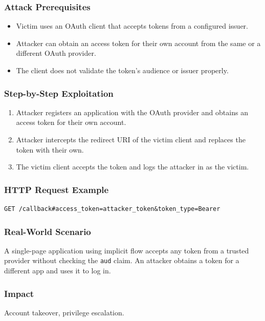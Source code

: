 \documentclass[12pt,a4paper]{article}
\begin{document}
\subsubsection{Attack Prerequisites}
\begin{itemize}
    \item Victim uses an OAuth client that accepts tokens from a configured issuer.
    \item Attacker can obtain an access token for their own account from the same or a different OAuth provider.
    \item The client does not validate the token's audience or issuer properly.
\end{itemize}

\subsubsection{Step-by-Step Exploitation}
\begin{enumerate}
    \item Attacker registers an application with the OAuth provider and obtains an access token for their own account.
    \item Attacker intercepts the redirect URI of the victim client and replaces the token with their own.
    \item The victim client accepts the token and logs the attacker in as the victim.
\end{enumerate}

\subsubsection{HTTP Request Example}
\begin{lstlisting}
GET /callback#access_token=attacker_token&token_type=Bearer
\end{lstlisting}


\subsubsection{Real-World Scenario}
A single-page application using implicit flow accepts any token from a trusted provider without checking the \texttt{aud} claim. An attacker obtains a token for a different app and uses it to log in.

\subsubsection{Impact}
Account takeover, privilege escalation.
\end{document}

